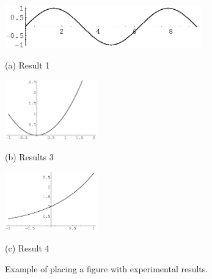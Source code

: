 \documentclass{article}
\begin{document}
\begin{figure}[htb]

\begin{minipage}[b]{1.0\linewidth}
  \centering
  \centerline{\includegraphics[width=8.5cm]{image1.eps}}
  \centerline{(a) Result 1}\medskip
\end{minipage}
%
\begin{minipage}[b]{.48\linewidth}
  \centering
  \centerline{\includegraphics[width=4.0cm]{image3.eps}}
  \centerline{(b) Results 3}\medskip
\end{minipage}
\hfill
\begin{minipage}[b]{0.48\linewidth}
  \centering
  \centerline{\includegraphics[width=4.0cm]{image4.eps}}
  \centerline{(c) Result 4}\medskip
\end{minipage}
%
\caption{Example of placing a figure with experimental results.}
\label{fig:res}
%
\end{figure}



\vfill\pagebreak






\end{document}
